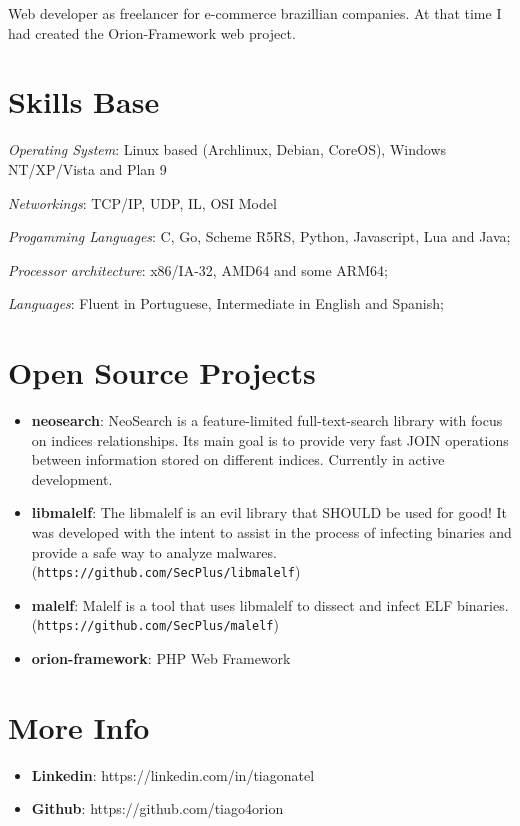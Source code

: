 \documentclass[margin]{res}
\begin{document}
\begin{resume}
   Web developer as freelancer for e-commerce brazillian companies. At that time I had created the Orion-Framework web project.



\section{Skills Base}  \textit{Operating System}:  Linux based (Archlinux, Debian, CoreOS), Windows NT/XP/Vista and Plan 9

			\textit{Networkings}: TCP/IP, UDP, IL, OSI Model
  
			\textit{Progamming Languages}: C, Go, Scheme R5RS, Python, Javascript, Lua and Java;
  
			\textit{Processor architecture}:  x86/IA-32, AMD64 and some ARM64;

			\textit{Languages}: Fluent in Portuguese, Intermediate in English and Spanish;
 
\section{Open Source Projects}
		\begin{itemize}
		    \vspace{2mm}
		    \item \textbf{neosearch}: NeoSearch is a feature-limited full-text-search library with focus on indices relationships. Its main goal is to provide very fast JOIN operations between information stored on different indices. Currently in active development.  \vspace{1mm}
		    \item \textbf{libmalelf}: The libmalelf is an evil library that SHOULD be used for good! It was developed
		                              with the intent to assist in the process of infecting binaries and provide a safe 
		                              way to analyze malwares. (\texttt{https://github.com/SecPlus/libmalelf})\vspace{1mm}
		                              
		    \item \textbf{malelf}: Malelf is a tool that uses libmalelf to dissect and infect ELF binaries. 
		                           (\texttt{https://github.com/SecPlus/malelf})
		 \item \textbf{orion-framework}: PHP Web Framework
		
		\end{itemize}
 
\section{More Info}
    \begin{itemize}
        \item \textbf{Linkedin}: https://linkedin.com/in/tiagonatel
         \item \textbf{Github}: https://github.com/tiago4orion
    \end{itemize}


\end{resume} 
\end{document}
